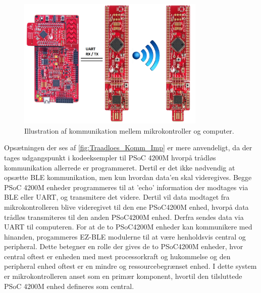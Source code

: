 \begin{figure}[H]
	\centering
	\includegraphics[width=0.8\textwidth]{figures/Traadloes_Komm_Imp}
	\caption{Illustration af kommunikation mellem mikrokontroller og computer.} 
	\label{fig:Traadloes_Komm_Imp}
\end{figure}

Opsætningen der ses af \autoref{fig:Traadloes_Komm_Imp} er mere anvendeligt, da der tages udgangspunkt i kodeeksempler til PSoC 4200M hvorpå trådløs kommunikation allerrede er programmeret. Dertil er det ikke nødvendig at opsætte BLE kommunikation, men kun hvordan data'en skal videregives. 
Begge PSoC 4200M enheder programmeres til at 'echo' information der modtages via BLE eller UART, og transmitere det videre. Dertil vil data modtaget fra mikrokontrolleren blive videregivet til den ene PSoC4200M enhed, hvorpå data trådløs transmiteres til den anden PSoC4200M enhed. Derfra sendes data via UART til computeren. 
For at de to PSoC4200M enheder kan kommunikere med hinanden, progammeres EZ-BLE modulerne til at være henholdsvis central og peripheral. Dette betegner en rolle der gives de to PSoC4200M enheder, hvor central oftest er enheden med mest processorkraft og hukommelse og den peripheral enhed oftest er en mindre og ressourcebegrænset enhed. I dette system er mikrokontrolleren anset som en primær komponent, hvortil den tilsluttede PSoC 4200M enhed defineres som central.   